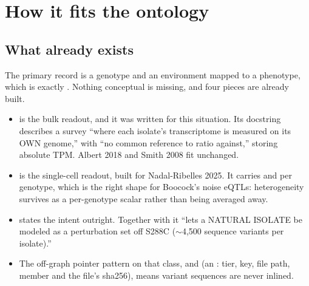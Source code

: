 
\section{How it fits the ontology}\label{sec:ontology}

\subsection{What already exists}

The primary record is a genotype and an environment mapped to a phenotype, which is exactly
. Nothing conceptual is missing, and four pieces are already built.

\begin{itemize}[leftmargin=1.2em,itemsep=2pt,topsep=2pt]
  \item {} is the bulk readout, and it was written for this
    situation. Its docstring describes a survey ``where each isolate's transcriptome is
    measured on its OWN genome,'' with ``no common reference to ratio against,'' storing
    absolute TPM. Albert 2018 and Smith 2008 fit unchanged.
  \item {} is the single-cell readout, built for
    Nadal-Ribelles 2025. It carries  and  per genotype,
    which is the right shape for Boocock's noise eQTLs: heterogeneity survives as a
    per-genotype scalar rather than being averaged away.
  \item {} states the intent outright. Together with
     it ``lets a NATURAL ISOLATE be modeled as a
    perturbation set off S288C ($\sim$4,500 sequence variants per isolate).''
  \item The off-graph pointer pattern on that class,  and
     (an : tier, key, file path, member and the
    file's sha256), means variant sequences are never inlined.
\end{itemize}

